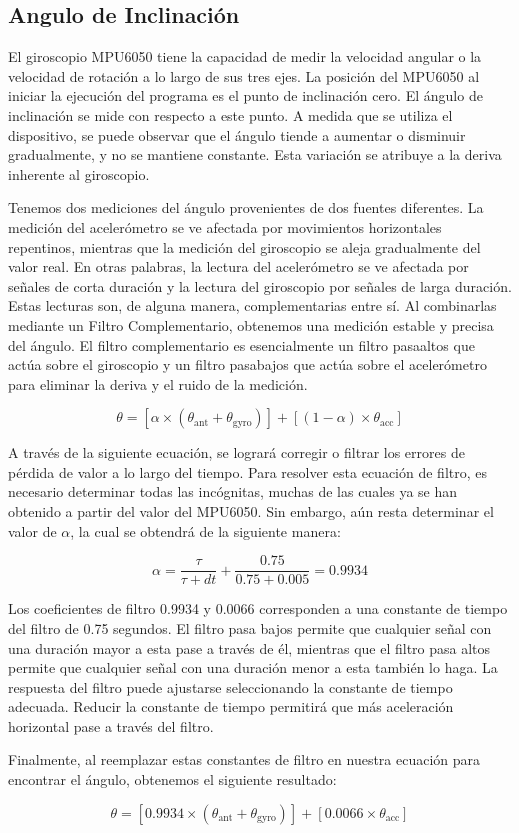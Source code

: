 \subsection{Angulo de Inclinación}
El giroscopio MPU6050 tiene la capacidad de medir la velocidad angular o la velocidad de rotación a lo largo de sus tres ejes. La posición del MPU6050 al iniciar la ejecución del programa es el punto de inclinación cero. El ángulo de inclinación se mide con respecto a este punto. A medida que se utiliza el dispositivo, se puede observar que el ángulo tiende a aumentar o disminuir gradualmente, y no se mantiene constante. Esta variación se atribuye a la deriva inherente al giroscopio.

Tenemos dos mediciones del ángulo provenientes de dos fuentes diferentes. La medición del acelerómetro se ve afectada por movimientos horizontales repentinos, mientras que la medición del giroscopio se aleja gradualmente del valor real. En otras palabras, la lectura del acelerómetro se ve afectada por señales de corta duración y la lectura del giroscopio por señales de larga duración. Estas lecturas son, de alguna manera, complementarias entre sí. Al combinarlas mediante un Filtro Complementario, obtenemos una medición estable y precisa del ángulo. El filtro complementario es esencialmente un filtro pasaaltos que actúa sobre el giroscopio y un filtro pasabajos que actúa sobre el acelerómetro para eliminar la deriva y el ruido de la medición.

\begin{equation}
    \theta = [ \alpha \times ( \theta_\mathrm{ant} + \theta_\mathrm{gyro} )] + [(1 - \alpha) \times \theta_\mathrm{acc}]
\end{equation}

A través de la siguiente ecuación, se logrará corregir o filtrar los errores de pérdida de valor a lo largo del tiempo. Para resolver esta ecuación de filtro, es necesario determinar todas las incógnitas, muchas de las cuales ya se han obtenido a partir del valor del MPU6050. Sin embargo, aún resta determinar el valor de $\alpha$, la cual se obtendrá de la siguiente manera:

\begin{equation}
    \alpha = \frac{\tau}{\tau + dt} + \frac{0.75}{0.75 + 0.005} = 0.9934
\end{equation}

Los coeficientes de filtro 0.9934 y 0.0066 corresponden a una constante de tiempo del filtro de 0.75 segundos. El filtro pasa bajos permite que cualquier señal con una duración mayor a esta pase a través de él, mientras que el filtro pasa altos permite que cualquier señal con una duración menor a esta también lo haga. La respuesta del filtro puede ajustarse seleccionando la constante de tiempo adecuada. Reducir la constante de tiempo permitirá que más aceleración horizontal pase a través del filtro.

Finalmente, al reemplazar estas constantes de filtro en nuestra ecuación para encontrar el ángulo, obtenemos el siguiente resultado:

\begin{equation}
    \theta = [ 0.9934 \times ( \theta_\mathrm{ant} + \theta_\mathrm{gyro} )] + [0.0066 \times \theta_\mathrm{acc}]
\end{equation}